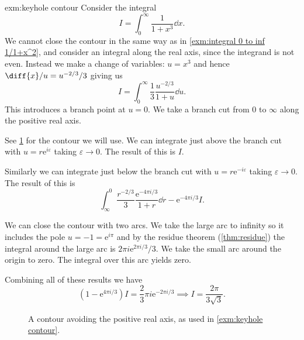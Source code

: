 \documentclass[fleqn]{NotesClass}
\newcommand*{\e}{\mathrm{e}}
\begin{document}
    \begin{exm}{}{exm:keyhole contour}
        Consider the integral
        \begin{equation}
            I = \int_0^{\infty} \frac{1}{1 + x^3}\dd{x}.
        \end{equation}
        We cannot close the contour in the same way as in \cref{exm:integral 0 to inf 1/1+x^2}, and consider an integral along the real axis, since the integrand is not even.
        Instead we make a change of variables: \(u = x^3\) and hence \(\diff{x}/{u} = u^{-2/3}/3\) giving us
        \begin{equation}
            I = \int_0^{\infty} \frac{1}{3}\frac{u^{-2/3}}{1 + u}\dd{u}.
        \end{equation}
        This introduces a branch point at \(u = 0\).
        We take a branch cut from 0 to \(\infty\) along the positive real axis.
        
        See \cref{fig:keyhole contour} for the contour we will use.
        We can integrate just above the branch cut with \(u = r\e^{i\varepsilon}\) taking \(\varepsilon \to 0\).
        The result of this is \(I\).
        
        Similarly we can integrate just below the branch cut with \(u = r\e^{-i\varepsilon}\) taking \(\varepsilon \to 0\).
        The result of this is
        \begin{equation}
            \int_{\infty}^{0} \frac{r^{-2/3}}{3}\frac{\e^{-4\pi i/3}}{1 + r} \dd{r} - \e^{-4\pi i/3}I.
        \end{equation}
        
        We can close the contour with two arcs.
        We take the large arc to infinity so it includes the pole \(u = -1 = \e^{i\pi}\) and by the residue theorem (\cref{thm:residue}) the integral around the large arc is \(2\pi i \e^{2\pi i/3}/3\).
        We take the small arc around the origin to zero.
        The integral over this arc yields zero.
       
       Combining all of these results we have
       \begin{equation}
           (1 - \e^{4\pi i/3})I = \frac{2}{3}\pi i\e^{-2\pi i/3} \implies I = \frac{2\pi}{3\sqrt{3}}.
       \end{equation}
    \end{exm}
    
    \begin{figure}
        \caption{A contour avoiding the positive real axis, as used in \cref{exm:keyhole contour}.}
        \label{fig:keyhole contour}
    \end{figure}
    
\end{document}
